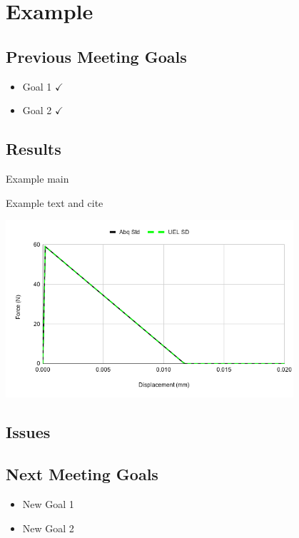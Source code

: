 \section{Example}
\subsection{Previous Meeting Goals}
\begin{frame}{}
\centering
\begin{minipage}{0.6\textwidth}
		\begin{itemize}
        \centering
			\item Goal 1 $\checkmark$
			\item Goal 2 $\checkmark$
		\end{itemize}
	\end{minipage}
\end{frame}


\subsection{Results}
\begin{frame}{Example main}
    \begin{minipage}{0.5\textwidth}
    Example text and cite \cite{Bessa2017a}
    \end{minipage}%
    \begin{minipage}{0.5\textwidth}
        \includegraphics[width=0.8\textwidth]{Example/Images/SE.png}   
    \end{minipage}
\end{frame}



\subsection{Issues}


\subsection{Next Meeting Goals}
\begin{frame}{}
\centering
\begin{minipage}{0.6\textwidth}
		\begin{itemize}
        \centering
			\item New Goal 1
			\item New Goal 2
		\end{itemize}
	\end{minipage}
\end{frame}